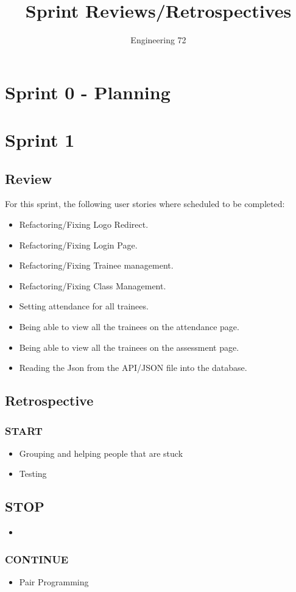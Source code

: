 \documentclass[]{report}
\title{Sprint Reviews/Retrospectives}
\author{Engineering 72}
\begin{document}
	\maketitle
	
	\begin{abstract}
	\end{abstract}
	\section{Sprint 0 - Planning}
	
	\section{Sprint 1}
	\subsection{Review}
	For this sprint, the following user stories where scheduled to be completed:
	\begin{itemize}
		\item Refactoring/Fixing Logo Redirect.
		\item Refactoring/Fixing Login Page.
		\item Refactoring/Fixing Trainee management.
		\item Refactoring/Fixing Class Management.
		\item Setting attendance for all trainees.
		\item Being able to view all the trainees on the attendance page.
		\item Being able to view all the trainees on the assessment page.
		\item Reading the Json from the API/JSON file into the database.
	\end{itemize}
	\subsection{Retrospective}
	\subsubsection{START}
	\begin{itemize}
		\item Grouping and helping people that are stuck
		\item Testing
	\end{itemize}
	\subsection{STOP}
	\begin{itemize}
		\item 
	\end{itemize}
	\subsubsection{CONTINUE}
	\begin{itemize}
		\item Pair Programming
	\end{itemize}
\end{document}
